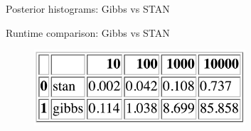 \begin{frame}{Posterior histograms: Gibbs vs STAN}
\vspace*{-1cm}
\begin{figure}
	\centering
\end{figure}
\end{frame}

\begin{frame}{Runtime comparison: Gibbs vs STAN}
\vspace*{-1cm}
\begin{figure}
	\centering
	\includegraphics[width=0.7\textwidth]{images/stanvsgibbs}
\end{figure}
\end{frame}

